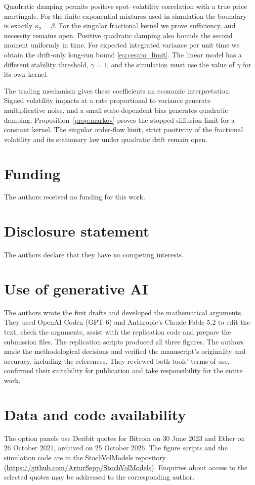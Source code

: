 \documentclass{rQUF2e}
\theoremstyle{plain}
\theoremstyle{definition}
\theoremstyle{remark}
\begin{document}
Quadratic damping permits positive spot--volatility correlation with a true price martingale. For the finite exponential mixtures used in simulation the boundary is exactly $\kappa_2=\beta$. For the singular fractional kernel we prove sufficiency, and necessity remains open. Positive quadratic damping also bounds the second moment uniformly in time. For expected integrated variance per unit time we obtain the drift-only long-run bound \eqref{eq:cesaro_limit}. The linear model has a different stability threshold, $\gamma=1$, and the simulation must use the value of $\gamma$ for its own kernel.

The trading mechanism gives these coefficients an economic interpretation. Signed volatility impacts at a rate proportional to variance generate multiplicative noise, and a small state-dependent bias generates quadratic damping. Proposition~\ref{prop:markov} proves the stopped diffusion limit for a constant kernel. The singular order-flow limit, strict positivity of the fractional volatility and its stationary law under quadratic drift remain open.
\section*{Funding}
The authors received no funding for this work.

\section*{Disclosure statement}
The authors declare that they have no competing interests.

\section*{Use of generative AI}
The authors wrote the first drafts and developed the mathematical arguments. They used OpenAI Codex (GPT-6) and Anthropic's Claude Fable 5.2 to edit the text, check the arguments, assist with the replication code and prepare the submission files. The replication scripts produced all three figures. The authors made the methodological decisions and verified the manuscript's originality and accuracy, including the references. They reviewed both tools' terms of use, confirmed their suitability for publication and take responsibility for the entire work.

\section*{Data and code availability}
The option panels use Deribit quotes for Bitcoin on 30 June 2023 and Ether on 26 October 2021, archived on 25 October 2026. The figure scripts and the simulation code are in the StochVolModels repository (\url{https://github.com/ArturSepp/StochVolModels}). Enquiries about access to the selected quotes may be addressed to the corresponding author.
\end{document}
